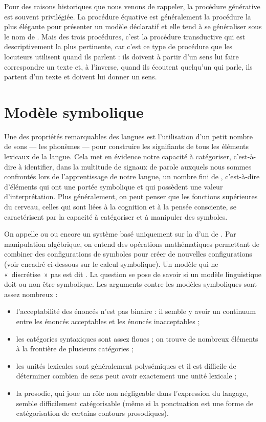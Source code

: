 {    Pour des raisons historiques que nous venons de rappeler, la procédure générative est souvent privilégiée. La procédure équative est généralement la procédure la plus élégante pour présenter un modèle déclaratif et elle tend à se généraliser sous le nom de . Mais des trois procédures, c’est la procédure transductive qui est descriptivement la plus pertinente, car c’est ce type de procédure que les locuteurs utilisent quand ils parlent : ils doivent à partir d’un sens lui faire correspondre un texte et, à l’inverse, quand ils écoutent quelqu’un qui parle, ils partent d’un texte et doivent lui donner un sens.
}
\section{Modèle symbolique}\label{sec:1.3.6}

Une des propriétés remarquables des langues est l’utilisation d’un petit nombre de sons — les phonèmes — pour construire les signifiants de tous les éléments lexicaux de la langue. Cela met en évidence notre capacité à catégoriser, c’est-à-dire à identifier, dans la multitude de signaux de parole auxquels nous sommes confrontés lors de l’apprentissage de notre langue, un nombre fini de , c’est-à-dire d’éléments qui ont une portée symbolique et qui possèdent une valeur d’interprétation. Plus généralement, on peut penser que les fonctions supérieures du cerveau, celles qui sont liées à la cognition et à la pensée consciente, se caractérisent par la capacité à catégoriser et à manipuler des symboles.

On appelle  ou  ou encore  un système basé uniquement sur la  d’un  de . Par manipulation algébrique, on entend des opérations mathématiques permettant de combiner des configurations de symboles pour créer de nouvelles configurations (voir encadré ci-dessous sur le calcul symbolique). Un modèle qui ne «~discrétise~» pas est dit . La question se pose de savoir si un modèle linguistique doit ou non être symbolique. Les arguments contre les modèles symboliques sont assez nombreux :

\begin{itemize}
\item l’acceptabilité des énoncés n’est pas binaire : il semble y avoir un continuum entre les énoncés acceptables et les énoncés inacceptables ;
\item les catégories syntaxiques sont assez floues ; on trouve de nombreux éléments à la frontière de plusieurs catégories ;
\item les unités lexicales sont généralement polysémiques et il est difficile de déterminer combien de sens peut avoir exactement une unité lexicale ;
\item la prosodie, qui joue un rôle non négligeable dans l’expression du langage, semble difficilement catégorisable (même si la ponctuation est une forme de catégorisation de certains contours prosodiques).
\end{itemize}

